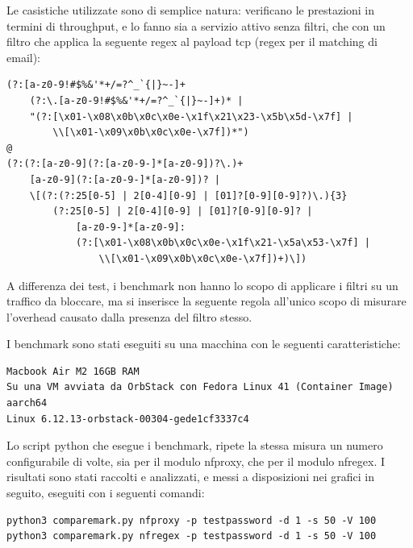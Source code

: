 Le casistiche utilizzate sono di semplice natura: verificano le prestazioni in termini di throughput, e lo fanno sia a servizio attivo senza filtri, che con un filtro che applica la seguente \gls{regex} al payload \gls{tcp} (\gls{regex} per il matching di email):
\begin{verbatim}
(?:[a-z0-9!#$%&'*+/=?^_`{|}~-]+
    (?:\.[a-z0-9!#$%&'*+/=?^_`{|}~-]+)* |
    "(?:[\x01-\x08\x0b\x0c\x0e-\x1f\x21\x23-\x5b\x5d-\x7f] |
        \\[\x01-\x09\x0b\x0c\x0e-\x7f])*")
@
(?:(?:[a-z0-9](?:[a-z0-9-]*[a-z0-9])?\.)+
    [a-z0-9](?:[a-z0-9-]*[a-z0-9])? |
    \[(?:(?:25[0-5] | 2[0-4][0-9] | [01]?[0-9][0-9]?)\.){3}
        (?:25[0-5] | 2[0-4][0-9] | [01]?[0-9][0-9]? |
            [a-z0-9-]*[a-z0-9]:
            (?:[\x01-\x08\x0b\x0c\x0e-\x1f\x21-\x5a\x53-\x7f] |
                \\[\x01-\x09\x0b\x0c\x0e-\x7f])+)\])
\end{verbatim}

A differenza dei test, i benchmark non hanno lo scopo di applicare i filtri su un traffico da bloccare, ma si inserisce la seguente regola all'unico scopo di misurare l'overhead causato dalla presenza del filtro stesso.

I benchmark sono stati eseguiti su una macchina con le seguenti caratteristiche:
\begin{listing}[H]
\begin{verbatim}
Macbook Air M2 16GB RAM
Su una VM avviata da OrbStack con Fedora Linux 41 (Container Image) aarch64
Linux 6.12.13-orbstack-00304-gede1cf3337c4
\end{verbatim}
\end{listing}

Lo script python che esegue i benchmark, ripete la stessa misura un numero configurabile di volte, sia per il modulo \gls{nfproxy}, che per il modulo \gls{nfregex}.
I risultati sono stati raccolti e analizzati, e messi a disposizioni nei grafici in seguito, eseguiti con i seguenti comandi:
\begin{listing}[H]
\begin{verbatim}
python3 comparemark.py nfproxy -p testpassword -d 1 -s 50 -V 100
python3 comparemark.py nfregex -p testpassword -d 1 -s 50 -V 100
\end{verbatim}
\end{listing}

